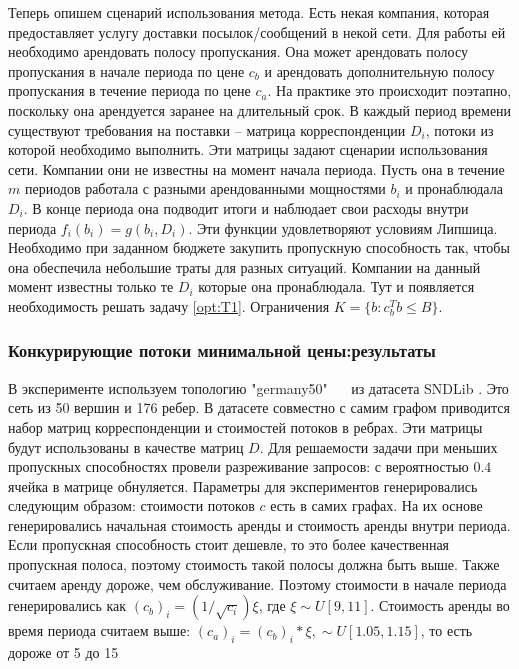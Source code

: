 Теперь опишем сценарий использования метода. Есть некая компания, которая предоставляет услугу доставки посылок/сообщений в некой сети. Для работы ей необходимо арендовать полосу пропускания. Она может арендовать полосу пропускания в начале периода по цене $c_b$ и арендовать дополнительную полосу пропускания в течение периода по цене $c_a$. На практике это происходит поэтапно, поскольку она арендуется заранее на длительный срок. В каждый период времени существуют требования на поставки -- матрица корреспонденции $D_i$, потоки из которой необходимо выполнить. Эти матрицы задают сценарии использования сети.  Компании они не известны на момент начала периода. Пусть она в течение $m$ периодов работала с разными арендованными мощностями $b_i$ и пронаблюдала $D_i$. В конце периода она подводит итоги и наблюдает свои расходы внутри периода $f_i(b_i) =g(b_i, D_i)$. Эти функции удовлетворяют условиям Липшица. Необходимо при заданном бюджете закупить пропускную способность так, чтобы она обеспечила небольшие траты для разных ситуаций. Компании на данный момент известны только те $D_i$ которые она пронаблюдала. Тут и появляется необходимость решать задачу \ref{opt:T1}. Ограничения $K = \{b: c_b^T b \leq B\}$.

\subsubsection{Конкурирующие потоки минимальной цены:результаты}

 В эксперименте используем топологию "germany50" ~~ из датасета SNDLib \cite{orlowski2010sndlib}. Это сеть из 50 вершин и 176 ребер. В датасете совместно с самим графом приводится набор матриц корреспонденции и стоимостей потоков в ребрах. Эти матрицы будут использованы в качестве матриц $D$. Для решаемости задачи при меньших пропускных способностях провели разреживание запросов: с вероятностью $0.4$ ячейка в матрице обнуляется. Параметры для экспериментов генерировались следующим образом: стоимости потоков $c$ есть в самих графах. На их основе генерировались начальная стоимость аренды и стоимость аренды внутри периода. Если пропускная способность стоит дешевле, то это более качественная пропускная полоса, поэтому стоимость такой полосы должна быть выше. Также считаем аренду дороже, чем обслуживание. Поэтому стоимости в начале периода генерировались как $(c_b)_i = (1/\sqrt{c_i}) \xi$, где $\xi \sim U[9, 11]$. Стоимость аренды во время периода считаем выше: $(c_a)_i = (c_b)_i * \xi, \sim U[1.05, 1.15]$, то есть дороже от 5 до 15%


